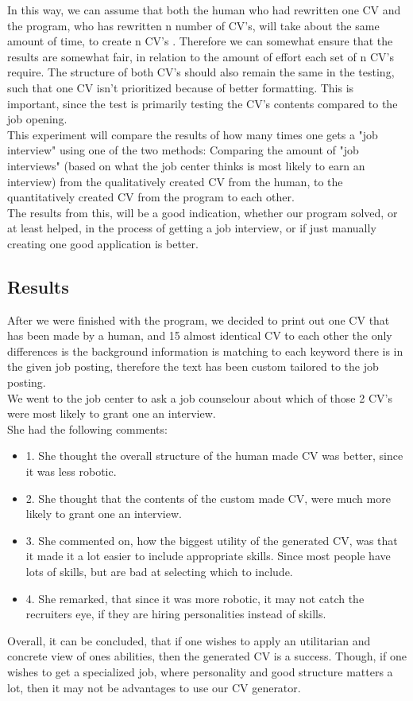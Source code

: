 In this way, we can assume that both the human who had rewritten one
CV and the program, who has rewritten n number of CV's,
will take about the same amount of time, to create n CV's .
Therefore we can somewhat ensure that the results are somewhat fair, in relation to the amount of effort each set of n CV's require.
The structure of both CV's should also remain the same in the testing, such that one CV isn't prioritized because of better formatting.
This is important, since the test is primarily testing the CV's contents compared to the job opening. \\

This experiment will compare the results of how many times one gets a "job
interview" using one of the two methods: Comparing the amount of 
"job interviews" (based on what the job center thinks is most likely to earn an interview) 
from the qualitatively created CV from
the human, to the quantitatively created CV from the program to
each other. \\

The results from this, will be a good indication, whether our program solved, or
at least helped, in the process of getting a job interview, or if just manually
creating one good application is better.

\subsection{Results}
After we were finished with the program, we decided to print out one CV that has been made by a human,
and 15 almost identical CV to each other the only differences is 
the background information is matching to each keyword there is in the given job posting, 
therefore the text has been custom tailored to the job posting. \\

We went to the job center to ask a job counselour about which of those 2 CV's were most likely to grant one an interview. \\

She had the following comments:
\begin{itemize}
  \item 1. She thought the overall structure of the human made CV was better, since it was less robotic.
  \item 2. She thought that the contents of the custom made CV, were much more likely to grant one an interview.
  \item 3. She commented on, how the biggest utility of the generated CV, was that it made it a lot easier to include appropriate skills. Since most people have lots of skills, but are bad at selecting which to include.
  \item 4. She remarked, that since it was more robotic, it may not catch the recruiters eye, if they are hiring personalities instead of skills.
\end{itemize}

Overall, it can be concluded, that if one wishes to apply an utilitarian and concrete view of ones abilities, then the generated CV is a success.
Though, if one wishes to get a specialized job, where personality and good structure matters a lot, then it may not be advantages to use our CV generator.

\clearpage